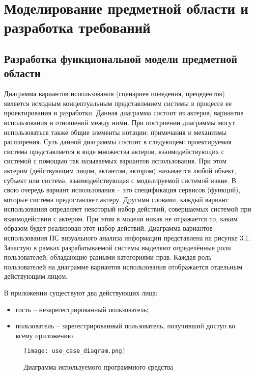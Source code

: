 \section{Моделирование предметной области и разработка требований}
\label{sec:func}
 
\subsection{Разработка функциональной модели предметной области}
Диаграмма вариантов использования (сценариев поведения, прецедентов) является исходным концептуальным представлением системы в процессе ее проектирования и разработки. Данная диаграмма состоит из актеров, вариантов использования и отношений между ними. При построении диаграммы могут использоваться также общие элементы нотации: примечания и механизмы расширения.
Суть данной диаграммы состоит в следующем: проектируемая система представляется в виде множества актеров, взаимодействующих с системой с помощью так называемых вариантов использования. При этом актером (действующим лицом, актантом, актором) называется любой объект, субъект или система, взаимодействующая с моделируемой системой извне. В свою очередь вариант использования – это спецификация сервисов (функций), которые система предоставляет актеру. Другими словами, каждый вариант использования определяет некоторый набор действий, совершаемых системой при взаимодействии с актером. При этом в модели никак не отражается то, каким образом будет реализован этот набор действий.
Диаграмма вариантов использования ПС визуального анализа информации представлена на рисунке 3.1.
Зачастую в рамках разрабатываемой системы выделяют определённые роли пользователей, обладающие разными категориями прав. Каждая роль пользователей на диаграмме вариантов использования отображается отдельным действующим лицом.

В приложении существуют два действующих лица:
\begin{itemize}
  \item гость – незарегестрированный пользователь;
  \item пользователь – зарегестрированный пользователь, получивший доступ ко всему приложению.
\end{itemize}

\begin{figure}[H]
 \centering
   \texttt{[image: use\_case\_diagram.png]} 
   \caption{Диаграмма используемого программного средства}
   \label{fig:domain:use_case_diagram}
\end{figure}


